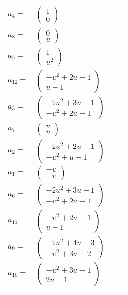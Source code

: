 \documentclass[1p]{elsarticle_modified}
\theoremstyle{definition}
\begin{document}
\begin{tabular}{m{7pt} m{180pt} m{7pt} m{180pt} }
\flushright $a_{4}=$&$\begin{pmatrix}1\\0\end{pmatrix}$ \\
\flushright $a_{8}=$&$\begin{pmatrix}0\\u\end{pmatrix}$ \\
\flushright $a_{5}=$&$\begin{pmatrix}1\\u^2\end{pmatrix}$ \\
\flushright $a_{12}=$&$\begin{pmatrix}- u^2+2 u-1\\u-1\end{pmatrix}$ \\
\flushright $a_{3}=$&$\begin{pmatrix}-2 u^2+3 u-1\\- u^2+2 u-1\end{pmatrix}$ \\
\flushright $a_{7}=$&$\begin{pmatrix}u\\u\end{pmatrix}$ \\
\flushright $a_{2}=$&$\begin{pmatrix}-2 u^2+2 u-1\\- u^2+u-1\end{pmatrix}$ \\
\flushright $a_{1}=$&$\begin{pmatrix}- u\\- u\end{pmatrix}$ \\
\flushright $a_{6}=$&$\begin{pmatrix}-2 u^2+3 u-1\\- u^2+2 u-1\end{pmatrix}$ \\
\flushright $a_{11}=$&$\begin{pmatrix}- u^2+2 u-1\\u-1\end{pmatrix}$ \\
\flushright $a_{9}=$&$\begin{pmatrix}-2 u^2+4 u-3\\- u^2+3 u-2\end{pmatrix}$ \\
\flushright $a_{10}=$&$\begin{pmatrix}- u^2+3 u-1\\2 u-1\end{pmatrix}$\\&\end{tabular}
\end{document}
